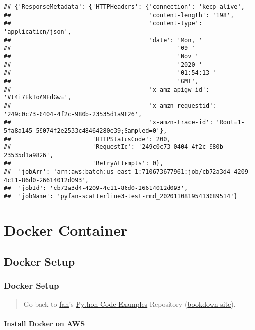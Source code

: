 \documentclass[
]{book}
\begin{document}
\begin{verbatim}
## {'ResponseMetadata': {'HTTPHeaders': {'connection': 'keep-alive',
##                                       'content-length': '198',
##                                       'content-type': 'application/json',
##                                       'date': 'Mon, '
##                                               '09 '
##                                               'Nov '
##                                               '2020 '
##                                               '01:54:13 '
##                                               'GMT',
##                                       'x-amz-apigw-id': 'Vt4i7EkToAMFdGw=',
##                                       'x-amzn-requestid': '249c0c73-0404-4f2c-980b-23535d1a9826',
##                                       'x-amzn-trace-id': 'Root=1-5fa8a145-59074f2e2533c48464280e39;Sampled=0'},
##                       'HTTPStatusCode': 200,
##                       'RequestId': '249c0c73-0404-4f2c-980b-23535d1a9826',
##                       'RetryAttempts': 0},
##  'jobArn': 'arn:aws:batch:us-east-1:710673677961:job/cb72a3d4-4209-4c11-86d0-26614012d093',
##  'jobId': 'cb72a3d4-4209-4c11-86d0-26614012d093',
##  'jobName': 'pyfan-scatterline3-test-rmd_20201108195413089514'}
\end{verbatim}

\hypertarget{docker-container}{%
\chapter{Docker Container}\label{docker-container}}

\hypertarget{docker-setup}{%
\section{Docker Setup}\label{docker-setup}}

\hypertarget{docker-setup-1}{%
\subsection{Docker Setup}\label{docker-setup-1}}

\begin{quote}
Go back to \href{http://fanwangecon.github.io/}{fan}'s \href{https://fanwangecon.github.io/pyfan/}{Python Code Examples} Repository (\href{https://fanwangecon.github.io/pyfan/bookdown}{bookdown site}).
\end{quote}

\hypertarget{install-docker-on-aws}{%
\subsubsection{Install Docker on AWS}\label{install-docker-on-aws}}
\end{document}

